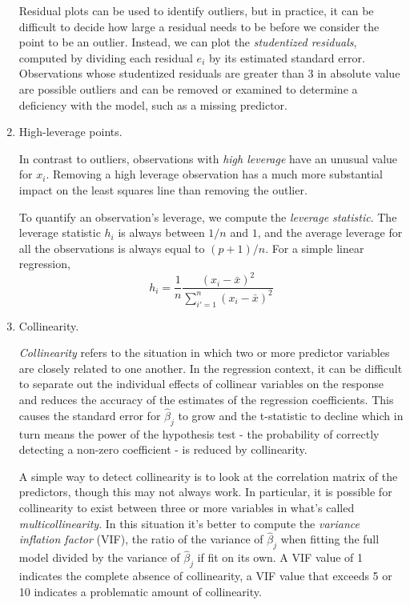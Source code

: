 \documentclass{article}
\numberwithin{equation}{section}
\begin{document}
\begin{enumerate}
    Residual plots can be used to identify outliers, but in practice, it can be difficult to decide how large a residual needs to be before we consider the point to be an outlier. Instead, we can plot the \textit{studentized residuals}, computed by dividing each residual $e_i$ by its estimated standard error. Observations whose studentized residuals are greater than 3 in absolute value are possible outliers and can be removed or examined to determine a deficiency with the model, such as a missing predictor.
    
    \item High-leverage points.
    
    In contrast to outliers, observations with \textit{high leverage} have an unusual value for $x_i$. Removing a high leverage observation has a much more substantial impact on the least squares line than removing the outlier.
    
    To quantify an observation’s leverage, we compute the \textit{leverage statistic}. The leverage statistic $h_i$ is always between $1/n$ and $1$, and the average leverage for all the observations is always equal to $(p + 1)/n$. For a simple linear regression,
    \begin{equation}\label{eq:leverage}
        h_i =  \frac{1}{n} \frac{(x_i - \bar x)^2}{\sum_{i' = 1}^n (x_i - \bar x)^2}
    \end{equation}
    
    \item Collinearity.
    
    \textit{Collinearity} refers to the situation in which two or more predictor variables are closely related to one another. In the regression context, it can be difficult to separate out the individual effects of collinear variables on the response and reduces the accuracy of the estimates of the regression coefficients. This causes the standard error for $\hat \beta_j$ to grow and the t-statistic to decline which in turn means the power of the hypothesis test - the probability of correctly detecting a non-zero coefficient - is reduced by collinearity.
    
    A simple way to detect collinearity is to look at the correlation matrix of the predictors, though this may not always work. In particular, it is possible for collinearity to exist between three or more variables in what's called \textit{multicollinearity}. In this situation it's better to compute the \textit{variance inflation factor} (VIF), the ratio of the variance of $\hat \beta_j$ when fitting the full model divided by the variance of $\hat \beta_j$ if fit on its own. A VIF value of 1 indicates the complete absence of collinearity, a VIF value that exceeds 5 or 10 indicates a problematic amount of collinearity.
    

\end{enumerate}
\end{document}
